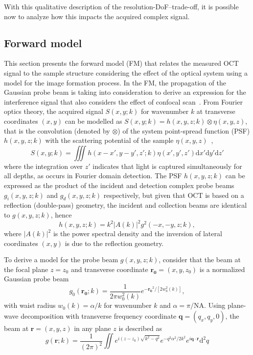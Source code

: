 With this qualitative description of the resolution-DoF--trade-off, it is possible now to analyze how this impacts the acquired complex signal.

\subsection{Forward model}

This section presents the forward model (FM) that relates the measured OCT signal to the sample structure considering the effect of the optical system using a model for the image formation process. In the FM, the propagation of the Gaussian probe beam is taking into consideration to derive an expression for the interference signal that also considers the effect of confocal scan~\cite{Ralston2006_Inverse, Ralston2006_NonParaxial}. From Fourier optics theory, the acquired signal $S(x,y; k)$ for wavenumber $k$ at transverse coordinates $(x,y)$ can be modelled as $S(x,y; k)= h(x,y,z; k)\otimes\eta(x,y,z)$, that is the convolution (denoted by $\otimes$) of the system point-spread function (PSF) $h(x,y,z; k)$ with the scattering potential of the sample $\eta(x,y,z)$~\cite{Davis2007_Nonparaxial},
\begin{equation}\label{eq:conv}
    S(x,y; k) = \iiint h(x-x', y-y', z'; k) \eta(x',y',z') \text{d}x' \text{d}y' \text{d}z'
\end{equation}
where the integration over $z'$ indicates that light is captured simultaneously for all depths, as occurs in Fourier domain detection. The PSF $h(x,y,z; k)$ can be expressed as the product of the incident and detection complex probe beams $g_i(x,y,z;k)$ and $g_d(x,y,z;k)$ respectively, but given that OCT is based on a reflection (double-pass) geometry, the incident and collection beams are identical to $g(x,y,z;k)$, hence~\cite{Ralston2006_Inverse}
\begin{equation}\label{eq:PSF1}
    h(x,y,z; k) =k^2|A(k)|^2g^2(-x, -y, z; k),
\end{equation}
where $|A(k)|^2$ is the power spectral density and the inversion of lateral coordinates $(x,y)$ is due to the reflection geometry.

To derive a model for the probe beam $g(x,y,z;k)$, consider that the beam at the focal plane $z=z_0$ and transverse coordinate $\mathbf{r_0} = (x,y,z_0)$ is a normalized Gaussian probe beam
\begin{equation}\label{}
    g_0(\mathbf{r_0}; k) = \frac{1}{2\pi w_0^2(k)}e^{-\mathbf{r_0}^2/[2w_0^2(k)]},
\end{equation}
with waist radius $w_0(k) = \alpha / k$ for wavenumber $k$ and $\alpha = \pi/\text{NA}$. Using plane-wave decomposition with transverse frequency coordinate $\mathbf{q} = (q_x, q_y, 0)$, the beam at $\mathbf{r} = (x, y, z)$ in any plane $z$ is described as~\cite{Ralston2006_Inverse}
\begin{equation}\label{}
    g(\mathbf{r}; k) = \frac{1}{(2\pi)^2} \iint e^{i(z-z_0)\sqrt{k^2 - q^2}} e^{-q^2\alpha^2/2k^2} e^{i\mathbf{q}\cdot\mathbf{r}} \text{d}^2q
\end{equation}

